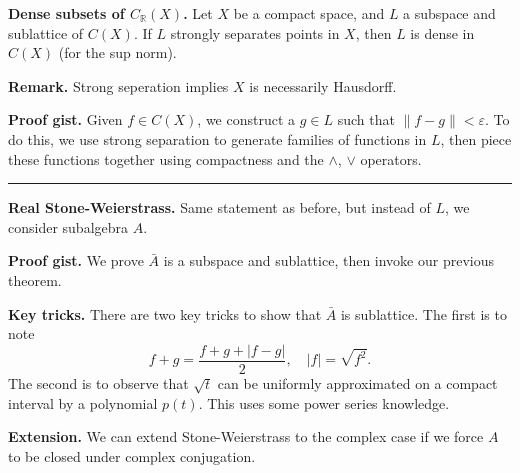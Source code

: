 \documentclass[12pt, letterpaper]{article}
\newcommand{\e}{\varepsilon}
\newcommand{\bR}{{\mathbb R}}
\begin{document}
\pagestyle{fancy}

\textbf{Dense subsets of $C_\bR(X)$.} Let $X$ be a compact space, and $L$ a subspace and sublattice of $C(X)$. If $L$ strongly separates points in $X$, then $L$ is dense in $C(X)$ (for the sup norm).

\textbf{Remark.} Strong seperation implies $X$ is necessarily Hausdorff.

\textbf{Proof gist.} Given $f \in C(X)$, we construct a $g \in L$ such that $\|f-g\| < \e$. To do this, we use strong separation to generate families of functions in $L$, then piece these functions together using compactness and the $\wedge$, $\vee$ operators.

\noindent\rule{\textwidth}{1pt}

\textbf{Real Stone-Weierstrass.} Same statement as before, but instead of $L$, we consider subalgebra $A$.

\textbf{Proof gist.} We prove $\bar{A}$ is a subspace and sublattice, then invoke our previous theorem.

\textbf{Key tricks.} There are two key tricks to show that $\bar{A}$ is sublattice. The first is to note
\[
    f + g = \frac{f + g + |f-g|}{2}, \quad |f| = \sqrt{f^2}.
\]
The second is to observe that $\sqrt{t}$ can be uniformly approximated on a compact interval by a polynomial $p(t)$. This uses some power series knowledge.

\textbf{Extension.} We can extend Stone-Weierstrass to the complex case if we force $A$ to be closed under complex conjugation.
\end{document}

